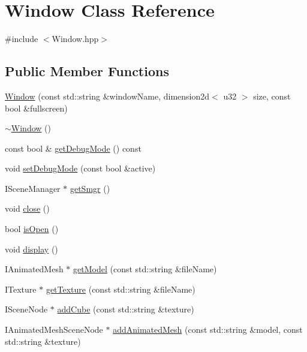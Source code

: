 \hypertarget{class_window}{}\section{Window Class Reference}
\label{class_window}


{\ttfamily \#include $<$Window.\+hpp$>$}

\subsection*{Public Member Functions}
\begin{DoxyCompactItemize}
\item 
\mbox{\hyperlink{class_window_aa54dffcc8f2e77ec1b50624e4ea26df1}{Window}} (const std\+::string \&window\+Name, dimension2d$<$ u32 $>$ size, const bool \&fullscreen)
\item 
\mbox{\hyperlink{class_window_a245d821e6016fa1f6970ccbbedd635f6}{$\sim$\+Window}} ()
\item 
const bool \& \mbox{\hyperlink{class_window_abffc0b8dd358c4b630b6742a02af41af}{get\+Debug\+Mode}} () const
\item 
void \mbox{\hyperlink{class_window_af3da99bf3e2c951b6600e5218de588b1}{set\+Debug\+Mode}} (const bool \&active)
\item 
I\+Scene\+Manager $\ast$ \mbox{\hyperlink{class_window_a27869844ea5a217d2900240dccfd060e}{get\+Smgr}} ()
\item 
void \mbox{\hyperlink{class_window_a35055c04498121d39741bfcd5082705b}{close}} ()
\item 
bool \mbox{\hyperlink{class_window_a0530ead23b2c91ef90a5f98e4df41cb8}{is\+Open}} ()
\item 
void \mbox{\hyperlink{class_window_afadfafa5a0b9472554759004aafb327e}{display}} ()
\item 
I\+Animated\+Mesh $\ast$ \mbox{\hyperlink{class_window_a484652aab3089f622a25592a0a8879f4}{get\+Model}} (const std\+::string \&file\+Name)
\item 
I\+Texture $\ast$ \mbox{\hyperlink{class_window_a87adb3354813045de3d5743ef66643d3}{get\+Texture}} (const std\+::string \&file\+Name)
\item 
I\+Scene\+Node $\ast$ \mbox{\hyperlink{class_window_a4741a5d47dd6887f7c3b92beda15f0cc}{add\+Cube}} (const std\+::string \&texture)
\item 
I\+Animated\+Mesh\+Scene\+Node $\ast$ \mbox{\hyperlink{class_window_acde6f6a5b6c11782ec5e59f895a25ce7}{add\+Animated\+Mesh}} (const std\+::string \&model, const std\+::string \&texture)

\end{DoxyCompactItemize}

